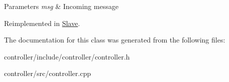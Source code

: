 \begin{DoxyParams}{Parameters}
{\em msg} & Incoming message \\
\hline
\end{DoxyParams}


Reimplemented in \hyperlink{classSlave_a2f80eae9dc8e4e20037c1a371f9b8189}{Slave}.



The documentation for this class was generated from the following files\+:\begin{DoxyCompactItemize}
\item 
controller/include/controller/controller.\+h\item 
controller/src/controller.\+cpp\end{DoxyCompactItemize}
